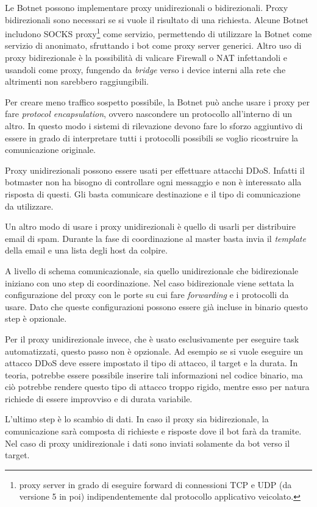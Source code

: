 Le Botnet possono implementare proxy unidirezionali o bidirezionali. 
Proxy bidirezionali sono necessari se si vuole il risultato di una richiesta. Alcune Botnet includono SOCKS proxy\footnote{proxy server in grado di eseguire forward di connessioni TCP e UDP (da versione 5 in poi) indipendentemente dal protocollo applicativo veicolato.}  come servizio, permettendo di utilizzare la Botnet come servizio di anonimato, sfruttando  i bot come proxy server generici.
Altro  uso di proxy bidirezionale è la possibilità di valicare Firewall o NAT infettandoli e usandoli come proxy, fungendo da \textit{bridge} verso i device interni alla rete che altrimenti non sarebbero raggiungibili.

Per creare meno traffico sospetto possibile, la Botnet può anche usare i proxy per fare \textit{protocol encapsulation}, ovvero nascondere un protocollo all'interno di un altro. In questo modo i sistemi di rilevazione devono fare lo sforzo aggiuntivo di essere in grado di interpretare tutti i protocolli possibili se voglio ricostruire la comunicazione originale.

Proxy unidirezionali possono essere usati per effettuare attacchi DDoS. Infatti il botmaster non ha bisogno di controllare ogni messaggio e non è interessato alla risposta di questi. Gli basta comunicare destinazione e il tipo di comunicazione da utilizzare.

Un altro modo di usare i proxy unidirezionali è quello di usarli per distribuire email di spam. Durante la fase di coordinazione al  master basta invia il \textit{template} della email e una lista degli host da colpire.

A livello di schema comunicazionale, sia quello unidirezionale che bidirezionale iniziano con uno step di coordinazione.
Nel caso bidirezionale viene settata la configurazione del proxy con le porte su cui fare \textit{forwarding} e i protocolli da usare. Dato che queste configurazioni possono essere già incluse in binario questo step è opzionale.

Per il proxy unidirezionale invece, che è usato esclusivamente per eseguire task automatizzati, questo passo non è opzionale. Ad esempio se si vuole eseguire un attacco DDoS deve essere impostato il tipo di attacco, il target e la durata. In teoria, potrebbe essere possibile inserire tali informazioni nel codice binario, ma ciò potrebbe rendere questo tipo di attacco troppo rigido, mentre esso per natura richiede di essere improvviso e di durata variabile.

L'ultimo step è lo scambio di dati. In caso il proxy sia bidirezionale, la comunicazione sarà composta di richieste e risposte dove il bot farà da tramite.  Nel caso di proxy unidirezionale i dati sono inviati solamente da bot verso il target. 
